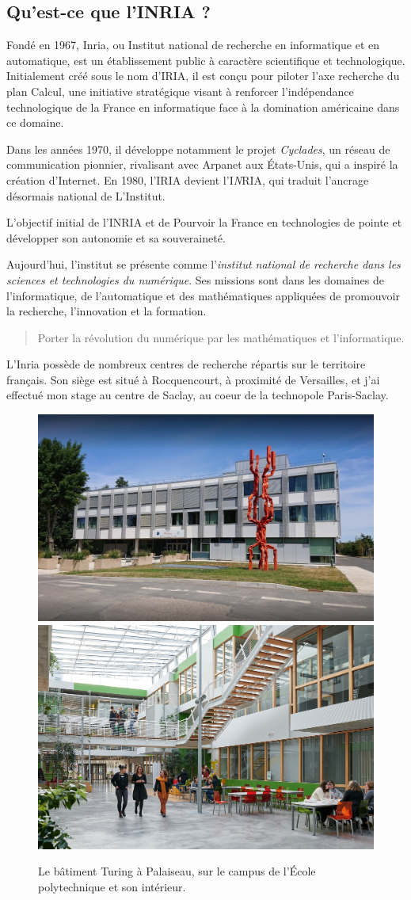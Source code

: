 \documentclass[12pt, letterpaper]{article}
\begin{document}
\subsection{Qu'est-ce que l'INRIA ?}
Fondé en 1967, Inria, ou Institut national de recherche en informatique et en automatique, est un établissement public à caractère scientifique et technologique.
Initialement créé sous le nom d'IRIA, il est conçu pour piloter l'axe recherche du \og plan Calcul\fg, une initiative stratégique visant à renforcer l'indépendance technologique de la France en informatique face à la domination américaine dans ce domaine.

Dans les années 1970, il développe notamment le projet \emph{Cyclades}, un réseau de communication pionnier, rivalisant avec Arpanet aux États-Unis, qui a inspiré la création d'Internet.
En 1980, l'IRIA devient l'I\emph{N}RIA, qui traduit l'ancrage désormais national de L'Institut.

L'objectif initial de l'INRIA et de \og Pourvoir la France en technologies de pointe et développer son autonomie et sa souveraineté\fg.

\vspace{5mm}

Aujourd'hui, l'institut se présente comme l'\emph{institut national de recherche dans les sciences et technologies du numérique}. Ses missions sont dans les domaines de l'informatique, de l'automatique et des
mathématiques appliquées de promouvoir la recherche, l'innovation et la formation.

\begin{quotation}
    \og Porter la révolution du numérique par les mathématiques et l'informatique.\fg \cite{mission-inria}
\end{quotation}

L'Inria possède de nombreux centres de recherche répartis sur le territoire français. Son siège est situé à Rocquencourt, à proximité de Versailles, et j'ai effectué mon stage au centre de Saclay, au coeur de la technopole Paris-Saclay.
\begin{figure}[h]
    \centering
    \includegraphics[height=0.28\textwidth]{inria_saclay}
    \hspace{1em}
    \includegraphics[height=0.28\textwidth]{interieur}
    \caption{Le bâtiment Turing à Palaiseau, sur le campus de l'École polytechnique et son intérieur.}
\end{figure}
\end{document}
